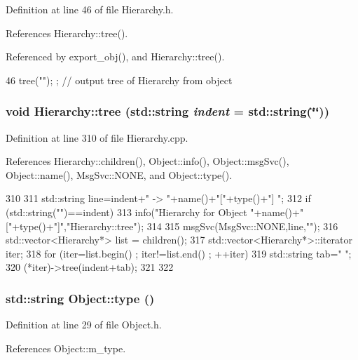 Definition at line 46 of file Hierarchy.h.

References Hierarchy::tree().

Referenced by export\_\-obj(), and Hierarchy::tree().


\begin{DoxyCode}
46 { tree(""); };                     // output tree of Hierarchy from object
\end{DoxyCode}
\hypertarget{classHierarchy_a76e914b9a677a22a82deb74d892bf261}{
\subsubsection[{tree}]{\setlength{\rightskip}{0pt plus 5cm}void Hierarchy::tree (std::string {\em indent} = {\ttfamily std::string(\char`\"{}\char`\"{})})}}
\label{classHierarchy_a76e914b9a677a22a82deb74d892bf261}


Definition at line 310 of file Hierarchy.cpp.

References Hierarchy::children(), Object::info(), Object::msgSvc(), Object::name(), MsgSvc::NONE, and Object::type().


\begin{DoxyCode}
310                                     {
311   std::string line=indent+" -> "+name()+"["+type()+"] ";
312   if (std::string("")==indent){
313     info("Hierarchy for Object "+name()+"["+type()+"]","Hierarchy::tree");
314   }
315   msgSvc(MsgSvc::NONE,line,"");
316   std::vector<Hierarchy*> list = children();
317   std::vector<Hierarchy*>::iterator iter;
318   for (iter=list.begin() ; iter!=list.end() ; ++iter){
319     std::string tab="  ";
320     (*iter)->tree(indent+tab);
321   }
322 }
\end{DoxyCode}
\hypertarget{classObject_a84f99f70f144a83e1582d1d0f84e4e62}{
\subsubsection[{type}]{\setlength{\rightskip}{0pt plus 5cm}std::string Object::type ()}}
\label{classObject_a84f99f70f144a83e1582d1d0f84e4e62}


Definition at line 29 of file Object.h.

References Object::m\_\-type.


